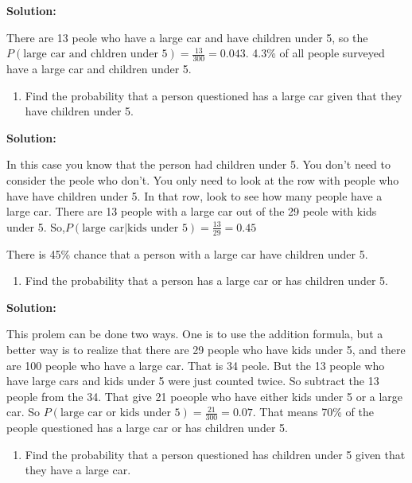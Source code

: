 \documentclass[]{book}
\providecommand{\tightlist}{%
  \setlength{\itemsep}{0pt}\setlength{\parskip}{0pt}}
\begin{document}
\textbf{Solution:}

There are 13 peole who have a large car and have children under 5, so the \(P(\text{large car and chldren under 5})=\frac{13}{300}=0.043\). 4.3\% of all people surveyed have a large car and children under 5.

\begin{enumerate}
\def\labelenumi{\alph{enumi}.}
\setcounter{enumi}{3}
\tightlist
\item
  Find the probability that a person questioned has a large car given that they have children under 5.
\end{enumerate}

\textbf{Solution:}

In this case you know that the person had children under 5. You don't need to consider the peole who don't. You only need to look at the row with people who have have children under 5. In that row, look to see how many people have a large car. There are 13 people with a large car out of the 29 peole with kids under 5. So,\(P(\text{large car|kids under 5})=\frac{13}{29}=0.45\)

There is 45\% chance that a person with a large car have children under 5.

\begin{enumerate}
\def\labelenumi{\alph{enumi}.}
\setcounter{enumi}{4}
\tightlist
\item
  Find the probability that a person has a large car or has children under 5.
\end{enumerate}

\textbf{Solution:}

This prolem can be done two ways. One is to use the addition formula, but a better way is to realize that there are 29 people who have kids under 5, and there are 100 people who have a large car. That is 34 peole. But the 13 people who have large cars and kids under 5 were just counted twice. So subtract the 13 people from the 34. That give 21 poeople who have either kids under 5 or a large car. So \(P(\text{large car or kids under 5})=\frac{21}{300}=0.07\). That means 70\% of the people questioned has a large car or has children under 5.

\begin{enumerate}
\def\labelenumi{\alph{enumi}.}
\setcounter{enumi}{5}
\tightlist
\item
  Find the probability that a person questioned has children under 5 given that they have a large car.
\end{enumerate}
\end{document}
